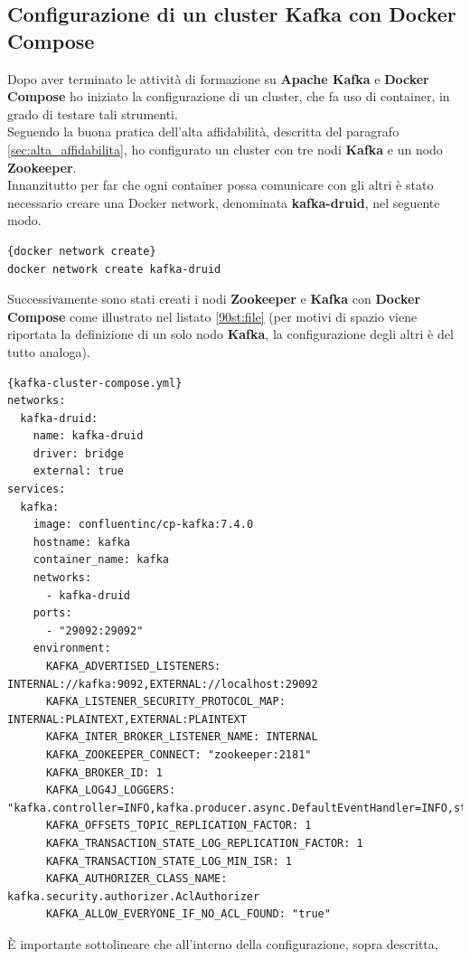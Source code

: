 \subsection{Configurazione di un cluster Kafka con Docker Compose}
Dopo aver terminato le attività di formazione su \textbf{Apache Kafka} e \textbf{Docker Compose} 
ho iniziato la configurazione di un \gls{cluster}{}, che fa uso di \gls{container}{}, in grado di testare tali strumenti.
\\Seguendo la buona pratica dell'alta affidabilità, descritta del 
paragrafo \ref{sec:alta_affidabilita}, ho configurato un \gls{cluster}{} con tre nodi \textbf{Kafka} e un nodo \textbf{Zookeeper}.\\
Innanzitutto per far che ogni \gls{container}{} possa comunicare con gli altri è stato necessario creare una 
\gls{Docker network}{}, denominata \textbf{kafka-druid}, nel seguente modo.
\begin{lstlisting}[caption=\texttt{docker network create}, label=lst:file]{docker network create}
docker network create kafka-druid
\end{lstlisting}
Successivamente sono stati creati i nodi \textbf{Zookeeper} e \textbf{Kafka} con \textbf{Docker Compose} 
come illustrato nel listato \ref{90st:file} (per motivi di spazio viene riportata la definizione di un solo nodo \textbf{Kafka}, la configurazione degli altri è del tutto analoga).
\begin{lstlisting}[caption=\texttt{kafka-cluster-compose.yml}, label=90st:file]{kafka-cluster-compose.yml}
networks:
  kafka-druid:
    name: kafka-druid
    driver: bridge
    external: true
services:
  kafka:
    image: confluentinc/cp-kafka:7.4.0
    hostname: kafka
    container_name: kafka
    networks:
      - kafka-druid
    ports:
      - "29092:29092"
    environment:
      KAFKA_ADVERTISED_LISTENERS: INTERNAL://kafka:9092,EXTERNAL://localhost:29092
      KAFKA_LISTENER_SECURITY_PROTOCOL_MAP: INTERNAL:PLAINTEXT,EXTERNAL:PLAINTEXT
      KAFKA_INTER_BROKER_LISTENER_NAME: INTERNAL
      KAFKA_ZOOKEEPER_CONNECT: "zookeeper:2181"
      KAFKA_BROKER_ID: 1
      KAFKA_LOG4J_LOGGERS: "kafka.controller=INFO,kafka.producer.async.DefaultEventHandler=INFO,state.change.logger=INFO"
      KAFKA_OFFSETS_TOPIC_REPLICATION_FACTOR: 1
      KAFKA_TRANSACTION_STATE_LOG_REPLICATION_FACTOR: 1
      KAFKA_TRANSACTION_STATE_LOG_MIN_ISR: 1
      KAFKA_AUTHORIZER_CLASS_NAME: kafka.security.authorizer.AclAuthorizer
      KAFKA_ALLOW_EVERYONE_IF_NO_ACL_FOUND: "true"
\end{lstlisting}
È importante sottolineare che all'interno della configurazione, sopra descritta, 
